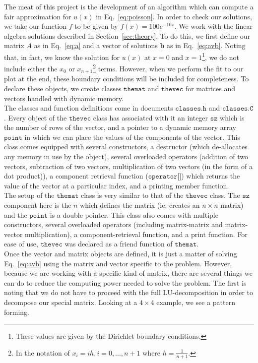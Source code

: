 \documentclass[12pt]{article}
\numberwithin{equation}{section}
\begin{document}
The meat of this project is the development of an algorithm which can compute a fair approximation for $u\left(x\right)$ in Eq.~\ref{eq:poisson}.  In order to check our solutions, we take our function $f$ to be given by $f\left(x\right) = 100e^{-10x}$.  We work with the linear algebra solutions described in Section~\ref{sec:theory}.  To do this, we first define our matrix $A$ as in Eq.~\ref{eq:a} and a vector of solutions $\textbf{b}$ as in Eq.~\ref{eq:avb}.  Noting that, in fact, we know the solution for $u\left(x\right)$ at $x=0$ and $x=1$\footnote{These values are given by the Dirichlet boundary conditions.}, we do not include either the $x_{0}$ or $x_{n+1}$\footnote{In the notation of $x_{i}=ih,i=0,\ldots,n+1$ where $h=\frac{1}{n+1}$.} terms.  However, when we perform the fit to our plot at the end, these boundary conditions will be included for completeness.  To declare these objects, we create classes $\texttt{themat}$ and $\texttt{thevec}$ for matrices and vectors handled with dynamic memory. 
\\\indent The classes and function definitions come in documents $\texttt{classes.h}$ and $\texttt{classes.C}$.  Every object of the $\texttt{thevec}$ class has associated with it an integer $\texttt{sz}$ which is the number of rows of the vector, and a pointer to a dynamic memory array $\texttt{point}$ in which we can place the values of the components of the vector.  This class comes equipped with several constructors, a destructor (which de-allocates any memory in use by the object), several overloaded operators (addition of two vectors, subtraction of two vectors, multiplication of two vectors (in the form of a dot product)), a component retrieval function ($\texttt{operator[]}$) which returns the value of the vector at a particular index, and a printing member function.  
\\\indent The setup of the $\texttt{themat}$ class is very similar to that of the $\texttt{thevec}$ class.  The $\texttt{sz}$ component here is the $n$ which defines the matrix (ie. creates an $n\times n$ matrix) and the $\texttt{point}$ is a double pointer.  This class also comes with multiple constructors, several overloaded operators (including matrix-matrix and matrix-vector multiplication), a component-retrieval function, and a print function.  For ease of use, $\texttt{thevec}$ was declared as a friend function of $\texttt{themat}$.  
\\\indent Once the vector and matrix objects are defined, it is just a matter of solving Eq.~\ref{eq:avb} using the matrix and vector specific to the problem.  However, because we are working with a specific kind of matrix, there are several things we can do to reduce the computing power needed to solve the problem.  The first is noting that we do not have to proceed with the full LU-decomposition in order to decompose our special matrix.  Looking at a $4\times4$ example, we see a pattern forming. 
\end{document}
